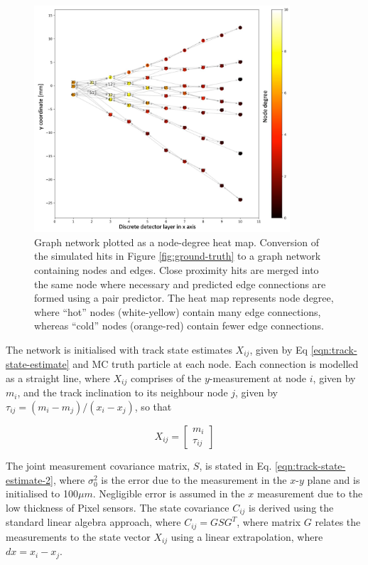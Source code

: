 \begin{figure}[htbp]
    \centering
    \includegraphics[width=0.85\textwidth]{images/5-gnn-algorithm/heatmap-network.png}
    \caption{Graph network plotted as a node-degree heat map. Conversion of the simulated hits in Figure \ref{fig:ground-truth} to a graph network containing nodes and edges. Close proximity hits are merged into the same node where necessary and predicted edge connections are formed using a pair predictor. The heat map represents node degree, where ``hot'' nodes (white-yellow) contain many edge connections, whereas ``cold'' nodes (orange-red) contain fewer edge connections.}
    \label{fig:heat-map}%
\end{figure}


The network is initialised with track state estimates $X_{ij}$, given by Eq \eqref{eqn:track-state-estimate} and MC truth particle at each node. Each connection is modelled as a straight line, where $X_{ij}$ comprises of the $y$-measurement at node $i$, given by $m_i$, and the track inclination to its neighbour node $j$, given by $\tau_{ij} = (m_i - m_j) / (x_i - x_j)$, so that

\begin{equation}
X_{ij} = \begin{bmatrix} m_i \\ \tau_{ij} \end{bmatrix}
\label{eqn:track-state-estimate}
\end{equation}


The joint measurement covariance matrix, $S$, is stated in Eq. \eqref{eqn:track-state-estimate-2}, where $\sigma_0^{2}$ is the error due to the measurement in the $x$-$y$ plane and is initialised to 100$\mu m$. Negligible error is assumed in the $x$ measurement due to the low thickness of Pixel sensors. The state covariance $C_{ij}$ is derived using the standard linear algebra approach, where $C_{ij} = GSG^T$, where matrix $G$ relates the measurements to the state vector $X_{ij}$ using a linear extrapolation, where $dx = x_i - x_j$.  

